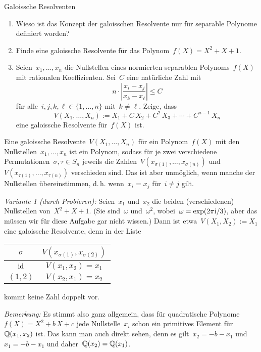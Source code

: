 \documentclass{algblatt}
\begin{document}
\begin{aufgabe}{Galoissche Resolventen}
\begin{enumerate}
\item Wieso ist das Konzept der galoisschen Resolvente nur für separable
Polynome definiert worden?

\item Finde eine galoissche Resolvente für das Polynom~$f(X) = X^2 + X + 1$.

\item Seien~$x_1,\ldots,x_n$ die Nullstellen eines normierten separablen
Polynoms~$f(X)$ mit rationalen Koeffizienten. Sei~$C$ eine natürliche Zahl mit
\[ n \cdot \left|\frac{x_i - x_j}{x_k - x_\ell}\right| \leq C \]
für alle~$i,j,k,\ell \in \{ 1,\ldots,n \}$ mit~$k \neq \ell$. Zeige, dass
\[ V(X_1,\ldots,X_n) := X_1 + C\,X_2 + C^2\,X_3 + \cdots + C^{n-1}\,X_n \]
eine galoissche Resolvente für~$f(X)$ ist.
\end{enumerate}

\begin{loesungE}
\item Eine galoissche Resolvente~$V(X_1,\ldots,X_n)$ für ein Polynom~$f(X)$ mit
den Nullstellen~$x_1,\ldots,x_n$ ist ein Polynom, sodass für je zwei
verschiedene Permutationen~$\sigma,\tau \in S_n$ jeweils die
Zahlen~$V(x_{\sigma(1)},\ldots,x_{\sigma(n)})$
und~$V(x_{\tau(1)},\ldots,x_{\tau(n)})$ verschieden sind. Das ist aber
unmöglich, wenn manche der Nullstellen übereinstimmen, d.\,h. wenn~$x_i = x_j$
für~$i \neq j$ gilt.

\item \emph{Variante 1 (durch Probieren):} Seien~$x_1$ und~$x_2$ die beiden
(verschiedenen) Nullstellen von~$X^2 + X + 1$.
(Sie sind~$\omega$ und~$\omega^2$, wobei~$\omega =
\exp(2\pi\mathrm{i}/3)$, aber das müssen wir für diese Aufgabe gar nicht wissen.) Dann
ist etwa~$V(X_1,X_2) := X_1$ eine galoissche Resolvente,
denn in der Liste
\begin{center}
  \begin{tabular}{c|c}
    $\sigma$ & $V(x_{\sigma(1)}, x_{\sigma(2)})$ \\\hline
    $\mathrm{id}$ & $V(x_1,x_2) = x_1$ \\
    $(1,2)$ & $V(x_2,x_1) = x_2$
  \end{tabular}
\end{center}
kommt keine Zahl doppelt vor.

\emph{Bemerkung:} Es stimmt also ganz allgemein, dass für quadratische
Polynome~$f(X) = X^2 + b\,X + c$ jede Nullstelle~$x_i$ schon ein primitives
Element für~$\mathbb{Q}(x_1,x_2)$ ist. Das kann man auch direkt sehen, denn es
gilt~$x_2 = -b - x_1$ und~$x_1 = -b - x_1$ und daher~$\mathbb{Q}(x_2) = \mathbb{Q}(x_1)$.


\end{loesungE}
\end{aufgabe}
\end{document}
